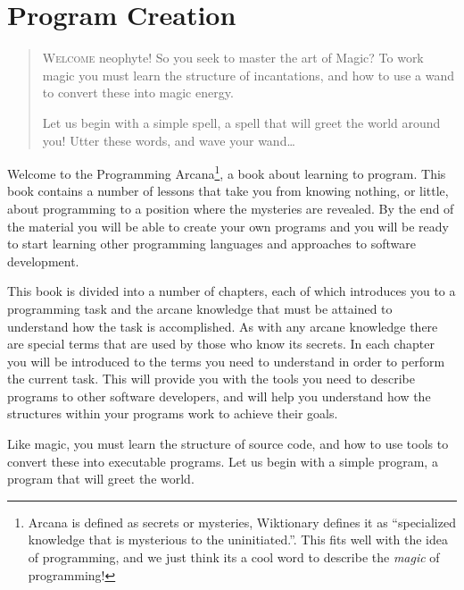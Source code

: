 
\chapter{Program Creation} %
\label{cha:programCreation}

\begin{quote}
  \Fontlukas\Large
  \renewcommand{\LettrineTextFont}{\relax}
  \renewcommand{\LettrineFontHook}{\color{red}}
  \lettrine[image=true,lines=3,lhang=.2, loversize=.25, findent=0.1em]
  {W}{elcome} neophyte! So you seek to master the art of Magic? To work magic you must learn the structure of incantations, and how to use a wand to convert these into magic energy. 
  
  Let us begin with a simple spell, a spell that will greet the world around you! Utter these words, and wave your wand\ldots
\end{quote}

\bigskip

Welcome to the Programming Arcana\footnote{Arcana is defined as secrets or mysteries, Wiktionary defines it as ``specialized knowledge that is mysterious to the uninitiated.''. This fits well with the idea of programming, and we just think its a cool word to describe the \emph{magic} of programming!}, a book about learning to program. This book contains a number of lessons that take you from knowing nothing, or little, about programming to a position where the mysteries are revealed. By the end of the material you will be able to create your own programs and you will be ready to start learning other programming languages and approaches to software development.

This book is divided into a number of chapters, each of which introduces you to a programming task and the arcane knowledge that must be attained to understand how the task is accomplished. As with any arcane knowledge there are special terms that are used by those who know its secrets. In each chapter you will be introduced to the terms you need to understand in order to perform the current task. This will provide you with the tools you need to describe programs to other software developers, and will help you understand how the structures within your programs work to achieve their goals.

Like magic, you must learn the structure of source code, and how to use tools to convert these into executable programs. Let us begin with a simple program, a program that will greet the world.

\clearpage





